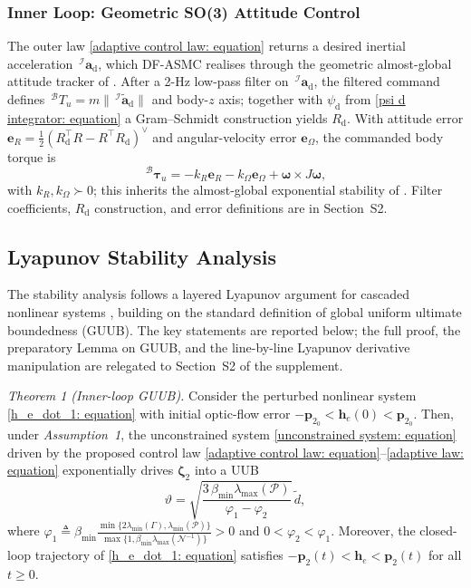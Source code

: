 \subsubsection{Inner Loop: Geometric SO(3) Attitude Control} \label{so3 inner loop: section}
The outer law \eqref{adaptive control law: equation} returns a desired inertial acceleration $\,^\mathcal{I}\boldsymbol{a}_\text{d}$, which DF-ASMC realises through the geometric almost-global attitude tracker of \cite{lee2010}. After a 2-Hz low-pass filter on $\,^\mathcal{I}\boldsymbol{a}_\text{d}$, the filtered command defines $\,^\mathcal{B}T_u=m\|\,^\mathcal{I}\tilde{\boldsymbol{a}}_\text{d}\|$ and body-$z$ axis; together with $\psi_\text{d}$ from \eqref{psi d integrator: equation} a Gram--Schmidt construction yields $R_\text{d}$. With attitude error $\boldsymbol{e}_R=\tfrac12(R_\text{d}^\top R-R^\top R_\text{d})^\vee$ and angular-velocity error $\boldsymbol{e}_\Omega$, the commanded body torque is
\begin{equation} \label{so3 torque: equation}
    \,^\mathcal{B}\boldsymbol{\tau}_u = -k_R\boldsymbol{e}_R - k_\Omega\boldsymbol{e}_\Omega + \boldsymbol{\omega}\times J\boldsymbol{\omega},
\end{equation}
with $k_R,k_\Omega\succ 0$; this inherits the almost-global exponential stability of \cite[Thm.~3.1]{lee2010}. Filter coefficients, $R_\text{d}$ construction, and error definitions are in Section~S2.

\subsection{Lyapunov Stability Analysis} \label{stability: section}
The stability analysis follows a layered Lyapunov argument for cascaded nonlinear systems \cite{khalil2002}, building on the standard definition of global uniform ultimate boundedness (GUUB). The key statements are reported below; the full proof, the preparatory Lemma on GUUB, and the line-by-line Lyapunov derivative manipulation are relegated to Section~S2 of the supplement.

\textit{Theorem 1 (Inner-loop GUUB).}
Consider the perturbed nonlinear system \eqref{h_e_dot_1: equation} with initial optic-flow error $-\boldsymbol{p}_{2_0}<\boldsymbol{h}_e(0)<\boldsymbol{p}_{2_0}$. Then, under \textit{Assumption~1}, the unconstrained system \eqref{unconstrained system: equation} driven by the proposed control law \eqref{adaptive control law: equation}--\eqref{adaptive law: equation} exponentially drives $\boldsymbol{\zeta}_2$ into a UUB
\begin{equation} \label{UUB bound: equation}
    \vartheta = \sqrt{\frac{3\,\beta_{\min}\lambda_{\max}(\mathcal{P})}{\varphi_1-\varphi_2}}\,\tilde{d},
\end{equation}
where $\varphi_1 \triangleq \beta_{\min}\frac{\min\{2\lambda_{\min}(\Gamma),\lambda_{\min}(\mathcal{P})\}}{\max\{1,\beta_{\min}\lambda_{\max}(\mathcal{N}^{-1})\}}>0$ and $0<\varphi_2<\varphi_1$. Moreover, the closed-loop trajectory of \eqref{h_e_dot_1: equation} satisfies $-\boldsymbol{p}_2(t)<\boldsymbol{h}_e<\boldsymbol{p}_2(t)$ for all $t\ge 0$.

